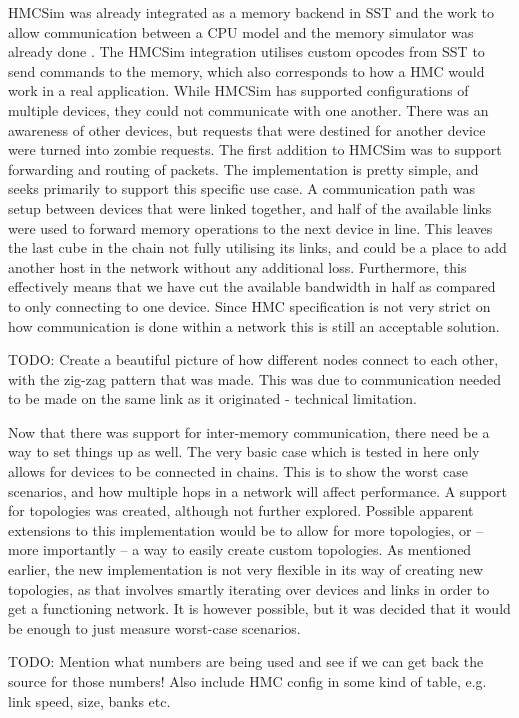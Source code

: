 HMCSim was already integrated as a memory backend in SST and the work to allow communication between a CPU model and the memory simulator was already done \cite{voskuilen2018sst}. The HMCSim integration utilises custom opcodes from SST to send commands to the memory, which also corresponds to how a HMC would work in a real application. While HMCSim has supported configurations of multiple devices, they could not communicate with one another. There was an awareness of other devices, but requests that were destined for another device were turned into zombie requests. The first addition to HMCSim was to support forwarding and routing of packets. The implementation is pretty simple, and seeks primarily to support this specific use case. A communication path was setup between devices that were linked together, and half of the available links were used to forward memory operations to the next device in line. This leaves the last cube in the chain not fully utilising its links, and could be a place to add another host in the network without any additional loss. Furthermore, this effectively means that we have cut the available bandwidth in half as compared to only connecting to one device. Since HMC specification is not very strict on how communication is done within a network this is still an acceptable solution.
\bigskip

TODO: Create a beautiful picture of how different nodes connect to each other, with the zig-zag pattern that was made. This was due to communication needed to be made on the same link as it originated - technical limitation.
\bigskip

Now that there was support for inter-memory communication, there need be a way to set things up as well. The very basic case which is tested in here only allows for devices to be connected in chains. This is to show the worst case scenarios, and how multiple hops in a network will affect performance. A support for topologies was created, although not further explored. Possible apparent extensions to this implementation would be to allow for more topologies, or -- more importantly -- a way to easily create custom topologies. As mentioned earlier, the new implementation is not very flexible in its way of creating new topologies, as that involves smartly iterating over devices and links in order to get a functioning network. It is however possible, but it was decided that it would be enough to just measure worst-case scenarios.
\bigskip

TODO: Mention what numbers are being used and see if we can get back the source for those numbers! Also include HMC config in some kind of table, e.g. link speed, size, banks etc.

